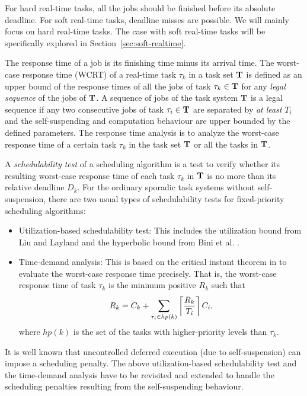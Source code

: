 For hard real-time tasks, all the jobs should be finished before its
absolute deadline. For soft real-time tasks, deadline misses are
possible. We will mainly focus on hard real-time tasks. The case with
soft real-time tasks will be specifically explored in
Section~\ref{sec:soft-realtime}.

The response time of a job is its finishing time minus its arrival
time.  The worst-case response time (WCRT) of a real-time task
$\tau_k$ in a task set ${\bf T}$ is defined as an upper bound of the
response times of all the jobs of task $\tau_k \in {\bf T}$ for any
\emph{legal sequence} of the jobs of ${\bf T}$. A sequence of jobs of
the task system ${\bf T}$ is a legal sequence if any two consecutive
jobs of task $\tau_i \in {\bf T}$ are separated by \emph{at least}
$T_i$ and the self-suspending and computation behaviour are upper
bounded by the defined parameters. The response time analysis is to
analyze the worst-case response time of a certain task $\tau_k$ in the
task set ${\bf T}$ or all the tasks in ${\bf T}$.

A \emph{schedulability test} of a scheduling algorithm is a test to
verify whether its resulting worst-case response time of each task
$\tau_k$ in ${\bf T}$ is no more than its relative deadline $D_k$. For
the ordinary sporadic task systems without self-suspension, there are
two usual types of schedulability tests for fixed-priority scheduling
algorithms:
\begin{itemize}
\item Utilization-based schedulability test: This includes the
  utilization bound from Liu and Layland \cite{Liu_1973}  and the
  hyperbolic bound from Bini et al. \cite{bini2003rate}.
\item Time-demand analysis: This is based on the critical instant
  theorem in
  \cite{Liu_1973} to evaluate the worst-case response time
  precisely. That is, the worst-case response time of task $\tau_k$ is
  the minimum positive $R_k$ such that
  \[
  R_k = C_k+ \sum_{\tau_i \in hp(k)}\left\lceil{\frac{R_k}{T_i}}\right\rceil C_i, 
  \]
  where $hp(k)$ is the set of the tasks with higher-priority levels
  than $\tau_k$.  
\end{itemize}

It is well known that uncontrolled deferred execution (due to
self-suspension) can impose a scheduling penalty. The above
utilization-based schedulability test and the time-demand analysis
have to be revisited and extended to handle the scheduling penalties
resulting from the self-suspending behaviour.




  
  
  